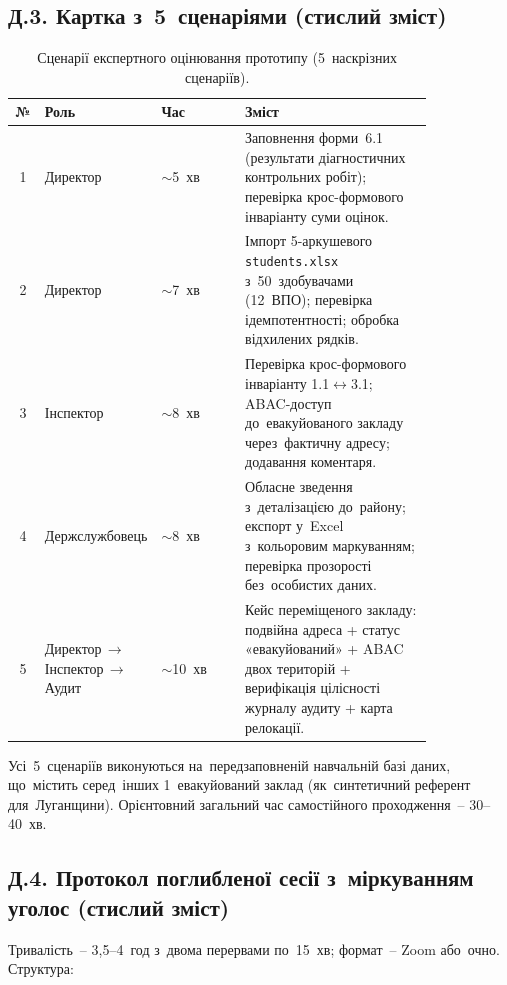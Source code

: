 \subsection*{Д.3. Картка з~5~сценаріями (стислий зміст)}
\label{app:eval-scenarios}

\begin{table}[htbp]
\centering
\caption{Сценарії експертного оцінювання прототипу (5~наскрізних сценаріїв).}
\label{tab:eval_scenarios}
\small
\setlength\tabcolsep{4pt}
\renewcommand{\arraystretch}{1.1}
\begin{tabular}{|c|p{0.18\linewidth}|p{0.20\linewidth}|p{0.45\linewidth}|}
\hline
\textbf{№} & \textbf{Роль} & \textbf{Час} & \textbf{Зміст} \\
\hline
1 & Директор & $\sim$5~хв & Заповнення форми~6.1 (результати діагностичних контрольних робіт); перевірка крос-формового інваріанту суми оцінок. \\
\hline
2 & Директор & $\sim$7~хв & Імпорт 5-аркушевого \texttt{students.xlsx} з~50~здобувачами (12~ВПО); перевірка ідемпотентності; обробка відхилених рядків. \\
\hline
3 & Інспектор & $\sim$8~хв & Перевірка крос-формового інваріанту 1.1$\leftrightarrow$3.1; ABAC-доступ до~евакуйованого закладу через~фактичну адресу; додавання коментаря. \\
\hline
4 & Держслужбовець & $\sim$8~хв & Обласне зведення з~деталізацією до~району; експорт у~Excel з~кольоровим маркуванням; перевірка прозорості без~особистих даних. \\
\hline
5 & Директор\,$\to$\,Інспектор\,$\to$\,Аудит & $\sim$10~хв & Кейс переміщеного закладу: подвійна адреса + статус «евакуйований» + ABAC двох територій + верифікація цілісності журналу аудиту + карта релокації. \\
\hline
\end{tabular}
\end{table}

Усі~5~сценаріїв виконуються на~передзаповненій навчальній базі даних, що~містить серед~інших 1~евакуйований заклад (як~синтетичний референт для~Луганщини). Орієнтовний загальний час самостійного проходження~-- 30--40~хв.

\subsection*{Д.4. Протокол поглибленої сесії з~міркуванням уголос (стислий зміст)}
\label{app:eval-session}

Тривалість~-- 3,5--4~год з~двома перервами по~15~хв; формат~-- Zoom або~очно. Структура:

